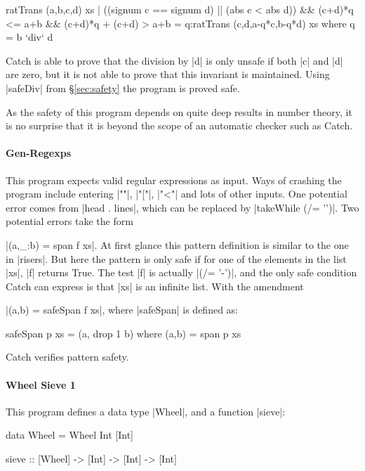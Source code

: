 \documentclass[preprint]{sigplanconf}
\begin{document}
\begin{code}
ratTrans (a,b,c,d) xs |
  ((signum c == signum d) || (abs c < abs d)) &&
  (c+d)*q <= a+b && (c+d)*q + (c+d) > a+b
     = q:ratTrans (c,d,a-q*c,b-q*d) xs
  where q = b `div` d
\end{code}

\noindent Catch is able to prove that the division by |d| is only unsafe if both |c| and |d| are zero, but it is not able to prove that this invariant is maintained. Using |safeDiv| from \S\ref{sec:safety} the program is proved safe.

As the safety of this program depends on quite deep results in number theory, it is no surprise that it is beyond the scope of an automatic checker such as Catch.

\paragraph{Gen-Regexps}

This program expects valid regular expressions as input. Ways of crashing the program include entering |""|, |"["|, |"<"| and lots of other inputs. One potential error comes from |head . lines|, which can be replaced by |takeWhile (/= '\n')|. Two potential errors take the form \ignore|(a,_:b) = span f xs|. At first glance this pattern definition is similar to the one in |risers|. But here the pattern is only safe if for one of the elements in the list |xs|, |f| returns True. The test |f| is actually |(/= '-')|, and the only safe condition Catch can express is that |xs| is an infinite list. With the amendment  \ignore|(a,b) = safeSpan f xs|, where |safeSpan| is defined as:

\begin{code}
safeSpan p xs = (a, drop 1 b) where (a,b) = span p xs
\end{code}

\noindent Catch verifies pattern safety.

\paragraph{Wheel Sieve 1}

This program defines a data type |Wheel|, and a function |sieve|:

\begin{code}
data Wheel = Wheel Int [Int]

sieve :: [Wheel] -> [Int] -> [Int] -> [Int]
\end{code}
\end{document}
